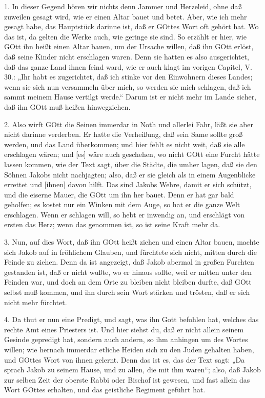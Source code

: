 1. In dieser Gegend hören wir nichts denn Jammer und Herzeleid, ohne daß zuweilen gesagt wird, wie er einen Altar bauet und betet. Aber, wie ich mehr gesagt habe, das Hauptstück darinne ist, daß er GOttes Wort oft gehört hat. Wo das ist, da gelten die Werke auch, wie geringe sie sind. So erzählt er hier, wie GOtt ihn heißt einen Altar bauen, um der Ursache willen, daß ihn GOtt erlöst, daß seine Kinder nicht erschlagen waren. Denn sie hatten es also ausgerichtet, daß das ganze Land ihnen feind ward, wie er auch klagt im vorigen Capitel, V. 30.: „Ihr habt es zugerichtet, daß ich stinke vor den Einwohnern dieses Landes; wenn sie sich nun versammeln über mich, so werden sie mich schlagen, daß ich sammt meinem Hause vertilgt werde.“ Darum ist er nicht mehr im Lande sicher, daß ihn GOtt muß heißen hinwegziehen.

2. Also wirft GOtt die Seinen immerdar in Noth und allerlei Fahr, läßt sie aber nicht darinne verderben. Er hatte die Verheißung, daß sein Same sollte groß werden, und das Land überkommen; und hier fehlt es nicht weit, daß sie alle erschlagen wären; und [es] wäre auch geschehen, wo nicht GOtt eine Furcht hätte lassen kommen, wie der Text sagt, über die Städte, die umher lagen, daß sie den Söhnen Jakobs nicht nachjagten; also, daß er sie gleich als in einem Augenblicke errettet und [ihnen] davon hilft. Das sind Jakobs Wehre, damit er sich schützt, und die eiserne Mauer, die GOtt um ihn her bauet. Denn er hat gar bald geholfen; es kostet nur ein Winken mit dem Auge, so hat er die ganze Welt erschlagen. Wenn er schlagen will, so hebt er inwendig an, und erschlägt von ersten das Herz; wenn das genommen ist, so ist seine Kraft mehr da.

3. Nun, auf dies Wort, daß ihn GOtt heißt ziehen und einen Altar bauen, machte sich Jakob auf in fröhlichem Glauben, und fürchtete sich nicht, mitten durch die Feinde zu ziehen. Denn da ist angezeigt, daß Jakob abermal in großen Furchten gestanden ist, daß er nicht wußte, wo er hinaus sollte, weil er mitten unter den Feinden war, und doch an dem Orte zu bleiben nicht bleiben durfte, daß GOtt selbst muß kommen, und ihn durch sein Wort stärken und trösten, daß er sich nicht mehr fürchtet.

4. Da thut er nun eine Predigt, und sagt, was ihn Gott befohlen hat, welches das rechte Amt eines Priesters ist. Und hier siehst du, daß er nicht allein seinem Gesinde gepredigt hat, sondern auch andern, so ihm anhingen um des Wortes willen; wie hernach immerdar etliche Heiden sich zu den Juden gehalten haben, und GOttes Wort von ihnen gelernt. Denn das ist es, das der Text sagt: „Da sprach Jakob zu seinem Hause, und zu allen, die mit ihm waren“; also, daß Jakob zur selben Zeit der oberste Rabbi oder Bischof ist gewesen, und fast allein das Wort GOttes erhalten, und das geistliche Regiment geführt hat.

